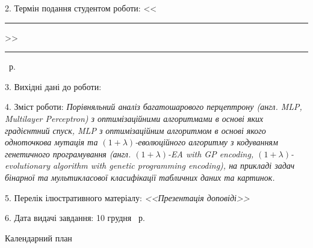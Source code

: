 2. Термін подання студентом роботи: <<\rule{0.5cm}{0.25pt}>> \rule{2.5cm}{0.25pt} \YearOfDefence~р.

3. Вихідні дані до роботи:

4. Зміст роботи: \emph{Порівняльний аналіз багатошарового перцептрону (англ. MLP, Multilayer Perceptron) з оптимізаційними алгоритмами в основі яких градієнтний спуск, MLP з оптимізаційним алгоритмом в основі якого одноточкова мутація та $(1+\lambda)$-еволюційного алгоритму з кодуванням генетичного програмування (англ. $(1+\lambda)$-EA with GP encoding, $(1+\lambda)$-evolutionary algorithm with genetic programming encoding), на прикладі задач бінарної та мультикласової класифікації табличних даних та картинок.}

5. Перелік ілюстративного матеріалу: \emph{<<Презентація доповіді>>}

6. Дата видачі завдання: 10 грудня \YearOfBeginning~р.


\begin{center}
	Календарний план
\end{center}

